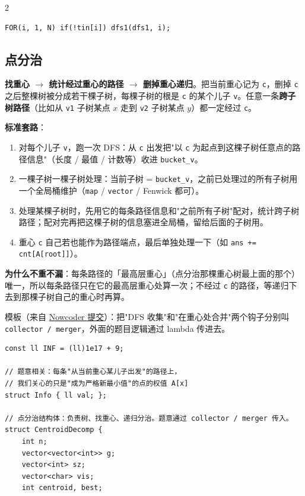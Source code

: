 \begin{multicols*}{2}
\begin{verbatim}
FOR(i, 1, N) if(!tin[i]) dfs1(dfs1, i);
		\end{verbatim}


		\subsection{点分治}

		\textbf{找重心 $\to$ 统计经过重心的路径 $\to$ 删掉重心递归}。把当前重心记为 \texttt{c}，删掉 \texttt{c} 之后整棵树被分成若干棵子树，每棵子树的根是 \texttt{c} 的某个儿子 \texttt{v}。任意一条\textbf{跨子树路径}（比如从 \texttt{v1} 子树某点 $x$ 走到 \texttt{v2} 子树某点 $y$）都一定经过 \texttt{c}。

		\textbf{标准套路}：

		\begin{enumerate}
			\item 对每个儿子 \texttt{v}，跑一次 DFS：从 \texttt{c} 出发把"以 \texttt{c} 为起点到这棵子树任意点的路径信息"（长度 / 最值 / 计数等）收进 \texttt{bucket\_v}。
			\item 一棵子树一棵子树处理：当前子树 = \texttt{bucket\_v}，之前已处理过的所有子树用一个全局桶维护（\texttt{map} / \texttt{vector} / Fenwick 都可）。
			\item 处理某棵子树时，先用它的每条路径信息和"之前所有子树"配对，统计跨子树路径；配对完再把这棵子树的信息塞进全局桶，留给后面的子树用。
			\item 重心 \texttt{c} 自己若也能作为路径端点，最后单独处理一下（如 \texttt{ans += cnt[A[root]]}）。
		\end{enumerate}

		\textbf{为什么不重不漏}：每条路径的「最高层重心」（点分治那棵重心树最上面的那个）唯一，所以每条路径只在它的最高层重心处算一次；不经过 \texttt{c} 的路径，等递归下去到那棵子树自己的重心时再算。

		模板（来自 \href{https://ac.nowcoder.com/acm/contest/view-submission?submissionId=80398271}{Nowcoder 提交}）：把"DFS 收集"和"在重心处合并"两个钩子分别叫 \texttt{collector / merger}，外面的题目逻辑通过 lambda 传进去。

		\begin{verbatim}
const ll INF = (ll)1e17 + 9;

// 题意相关：每条"从当前重心某儿子出发"的路径上，
// 我们关心的只是"成为严格新最小值"的点的权值 A[x]
struct Info { ll val; };

// 点分治结构体：负责树、找重心、递归分治。题意通过 collector / merger 传入。
struct CentroidDecomp {
    int n;
    vector<vector<int>> g;
    vector<int> sz;
    vector<char> vis;
    int centroid, best;


\end{verbatim}
\end{multicols*}
